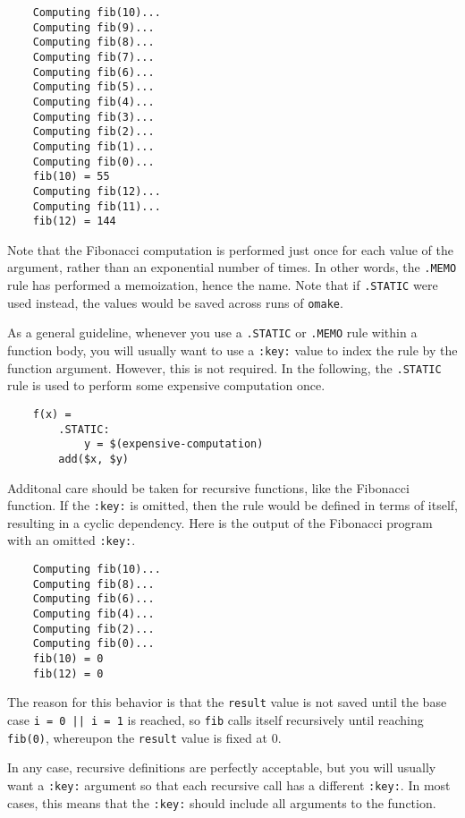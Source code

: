 \begin{verbatim}
    Computing fib(10)...
    Computing fib(9)...
    Computing fib(8)...
    Computing fib(7)...
    Computing fib(6)...
    Computing fib(5)...
    Computing fib(4)...
    Computing fib(3)...
    Computing fib(2)...
    Computing fib(1)...
    Computing fib(0)...
    fib(10) = 55
    Computing fib(12)...
    Computing fib(11)...
    fib(12) = 144
\end{verbatim}
%
Note that the Fibonacci computation is performed just once for each value of the argument, rather
than an exponential number of times.  In other words, the \verb+.MEMO+ rule has performed a
memoization, hence the name.  Note that if \verb+.STATIC+ were used instead, the values would be
saved across runs of \verb+omake+.

As a general guideline, whenever you use a \verb+.STATIC+ or \verb+.MEMO+ rule within a function
body, you will usually want to use a \verb+:key:+ value to index the rule by the function argument.
However, this is not required.  In the following, the \verb+.STATIC+ rule is used to perform some
expensive computation once.

\begin{verbatim}
    f(x) =
        .STATIC:
            y = $(expensive-computation)
        add($x, $y)
\end{verbatim}

Additonal care should be taken for recursive functions, like the Fibonacci function.  If the
\verb+:key:+ is omitted, then the rule would be defined in terms of itself, resulting in a cyclic
dependency.  Here is the output of the Fibonacci program with an omitted \verb+:key:+.

\begin{verbatim}
    Computing fib(10)...
    Computing fib(8)...
    Computing fib(6)...
    Computing fib(4)...
    Computing fib(2)...
    Computing fib(0)...
    fib(10) = 0
    fib(12) = 0
\end{verbatim}
%
The reason for this behavior is that the \verb+result+ value is not saved until the base case
\verb+i = 0 || i = 1+ is reached, so \verb+fib+ calls itself recursively until reaching
\verb+fib(0)+, whereupon the \verb+result+ value is fixed at 0.

In any case, recursive definitions are perfectly acceptable, but you will usually want a
\verb+:key:+ argument so that each recursive call has a different \verb+:key:+.  In most cases, this
means that the \verb+:key:+ should include all arguments to the function.

